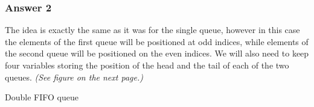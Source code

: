 \documentclass[11pt]{article}
\begin{document}
\subsubsection{Answer 2}
\label{sec-1-2-1}
The idea is exactly the same as it was for the single queue, however in this
case the elements of the first queue will be positioned at odd indices, while
elements of the second queue will be positioned on the even indices.  We will
also need to keep four variables storing the position of the head and the tail
of each of the two queues. \emph{(See figure on the next page.)}

\begin{algorithm}
  \caption{Double FIFO queue}
  \begin{algorithmic}
    \State {}
    \State {}
    \State {}
    \Else
    \EndIf
    \EndIf
    \EndProcedure

    \State {}
    \State {}
    \State {}
    \Else
    \EndIf
    \State {}
    \EndIf
    \EndProcedure

    \State {}
    \State {}
    \State {}
    \State {}
    \EndProcedure

    \State {}
    \State {}
    \State {}
    \EndProcedure
  \end{algorithmic}
\end{algorithm}
\end{document}
